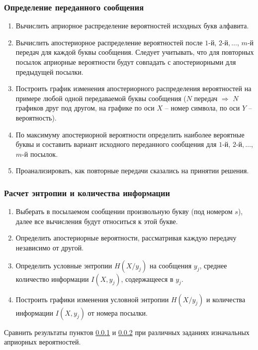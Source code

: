 \subsubsection{Определение переданного сообщения}
\label{sect:2:1:1}
\begin{enumerate}
	\item Вычислить априорное распределение вероятностей исходных букв алфавита.
	\item Вычислить апостериорное распределение вероятностей после $1$-й, $2$-й$,\dots$, $m$-й передач для каждой буквы сообщения. Следует учитывать, что для повторных посылок априорные вероятности будут совпадать с апостериорными для предыдущей посылки.
	\item Построить график изменения апостериорного распределения вероятностей на примере любой одной передаваемой буквы сообщения ($N$ передач $\Rightarrow$ $N$ графиков друг под другом, на графике по оси $X$ – номер символа, по оси $Y$ – вероятность).
	\item По максимуму апостериорной вероятности определить наиболее вероятные буквы и составить вариант исходного переданного сообщения для $1$-й, $2$-й$,\dots$, $m$-й посылок.
	\item Проанализировать, как повторные передачи сказались на принятии решения.
\end{enumerate}

\subsubsection{Расчет энтропии и количества информации}
\label{sect:2:1:2}
\begin{enumerate}
	\item Выберать в посылаемом сообщении произвольную букву (под номером $s$), далее все вычисления будут относиться к этой букве.
	\item Определить апостериорные вероятности, рассматривая каждую передачу независимо от другой.
	\item Определить условные энтропии $H(X/y_j)$ на сообщения $y_j$, среднее количество информации $I(X, y_j)$, содержащееся в $y_j$.
	\item Построить графики изменения условной энтропии $H(X/y_j)$ и количества информации $I(X, y_j)$ от номера посылки.
\end{enumerate}

Сравнить результаты пунктов \ref{sect:2:1:1} и \ref{sect:2:1:2} при различных заданиях изначальных априорных вероятностей.


